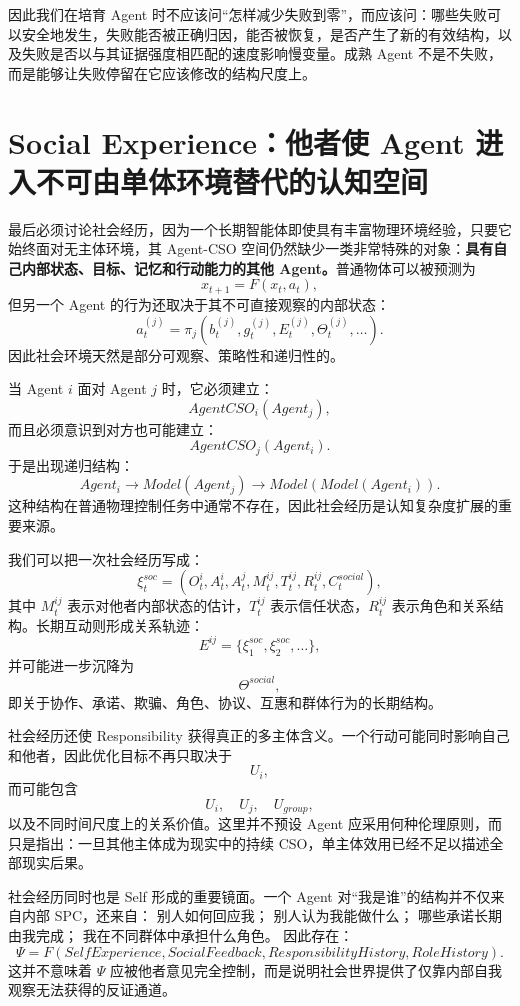 因此我们在培育 Agent 时不应该问“怎样减少失败到零”，而应该问：哪些失败可以安全地发生，失败能否被正确归因，能否被恢复，是否产生了新的有效结构，以及失败是否以与其证据强度相匹配的速度影响慢变量。成熟 Agent 不是不失败，而是能够让失败停留在它应该修改的结构尺度上。

\section{Social Experience：他者使 Agent 进入不可由单体环境替代的认知空间}

最后必须讨论社会经历，因为一个长期智能体即使具有丰富物理环境经验，只要它始终面对无主体环境，其 Agent-CSO 空间仍然缺少一类非常特殊的对象：\textbf{具有自己内部状态、目标、记忆和行动能力的其他 Agent。}普通物体可以被预测为
\[
x_{t+1}=F(x_t,a_t),
\]
但另一个 Agent 的行为还取决于其不可直接观察的内部状态：
\[
a_t^{(j)}
=
\pi_j
\left(
b_t^{(j)},
g_t^{(j)},
E_t^{(j)},
\Theta_t^{(j)},
\ldots
\right).
\]
因此社会环境天然是部分可观察、策略性和递归性的。

当 Agent $i$ 面对 Agent $j$ 时，它必须建立：
\[
AgentCSO_i(Agent_j),
\]
而且必须意识到对方也可能建立：
\[
AgentCSO_j(Agent_i).
\]
于是出现递归结构：
\[
Agent_i
\rightarrow
Model(Agent_j)
\rightarrow
Model(Model(Agent_i)).
\]
这种结构在普通物理控制任务中通常不存在，因此社会经历是认知复杂度扩展的重要来源。

我们可以把一次社会经历写成：
\[
\xi_t^{soc}
=
(
O_t^i,
A_t^i,
A_t^j,
M_t^{ij},
T_t^{ij},
R_t^{ij},
C_t^{social}
),
\]
其中 $M_t^{ij}$ 表示对他者内部状态的估计，$T_t^{ij}$ 表示信任状态，$R_t^{ij}$ 表示角色和关系结构。长期互动则形成关系轨迹：
\[
E^{ij}
=
\{\xi_1^{soc},\xi_2^{soc},\ldots\},
\]
并可能进一步沉降为
\[
\Theta^{social},
\]
即关于协作、承诺、欺骗、角色、协议、互惠和群体行为的长期结构。

社会经历还使 Responsibility 获得真正的多主体含义。一个行动可能同时影响自己和他者，因此优化目标不再只取决于
\[
U_i,
\]
而可能包含
\[
U_i,\quad
U_j,\quad
U_{group},
\]
以及不同时间尺度上的关系价值。这里并不预设 Agent 应采用何种伦理原则，而只是指出：一旦其他主体成为现实中的持续 CSO，单主体效用已经不足以描述全部现实后果。

社会经历同时也是 Self 形成的重要镜面。一个 Agent 对“我是谁”的结构并不仅来自内部 SPC，还来自：
别人如何回应我；
别人认为我能做什么；
哪些承诺长期由我完成；
我在不同群体中承担什么角色。
因此存在：
\[
\Psi
=
F
(
SelfExperience,
SocialFeedback,
ResponsibilityHistory,
RoleHistory
).
\]
这并不意味着 $\Psi$ 应被他者意见完全控制，而是说明社会世界提供了仅靠内部自我观察无法获得的反证通道。

